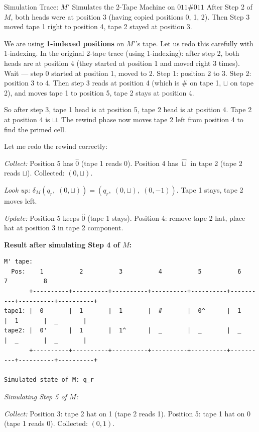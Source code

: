 \begin{examplebox}{{Simulation Trace: $M'$ Simulates the 2-Tape Machine on $011\#011$}}
After Step 2 of $M$, both heads were at position 3 (having copied positions 0, 1, 2). Then Step 3 moved tape 1 right to position 4, tape 2 stayed at position 3.

We are using \textbf{1-indexed positions} on $M'$'s tape. Let us redo this carefully with 1-indexing. In the original 2-tape trace (using 1-indexing): after step 2, both heads are at position 4 (they started at position 1 and moved right 3 times). Wait --- step 0 started at position 1, moved to 2. Step 1: position 2 to 3. Step 2: position 3 to 4. Then step 3 reads at position 4 (which is $\#$ on tape 1, $\sqcup$ on tape 2), and moves tape 1 to position 5, tape 2 stays at position 4.

So after step 3, tape 1 head is at position 5, tape 2 head is at position 4. Tape 2 at position 4 is $\sqcup$. The rewind phase now moves tape 2 left from position 4 to find the primed cell.

Let me redo the rewind correctly:

\textit{Collect:} Position 5 has $\hat{0}$ (tape 1 reads 0). Position 4 has $\hat{\sqcup}$ in tape 2 (tape 2 reads $\sqcup$). Collected: $(0, \sqcup)$.

\textit{Look up:} $\delta_M(q_r,\;(0, \sqcup)) = (q_r,\;(0, \sqcup),\;(0, -1))$. Tape 1 stays, tape 2 moves left.

\textit{Update:} Position 5 keeps $\hat{0}$ (tape 1 stays). Position 4: remove tape 2 hat, place hat at position 3 in tape 2 component.

\textbf{Result after simulating Step 4 of $M$:}

\begin{lstlisting}
M' tape:
  Pos:    1          2          3          4          5          6          7          8
       +----------+----------+----------+----------+----------+----------+----------+----------+
tape1: |  0       |  1       |  1       |  #       |  0^      |  1       |  1       |  _       |
tape2: |  0'      |  1       |  1^      |  _       |  _       |  _       |  _       |  _       |
       +----------+----------+----------+----------+----------+----------+----------+----------+

Simulated state of M: q_r
\end{lstlisting}

\textit{Simulating Step 5 of $M$:}

\textit{Collect:} Position 3: tape 2 hat on 1 (tape 2 reads 1). Position 5: tape 1 hat on 0 (tape 1 reads 0). Collected: $(0, 1)$.


\end{examplebox}
